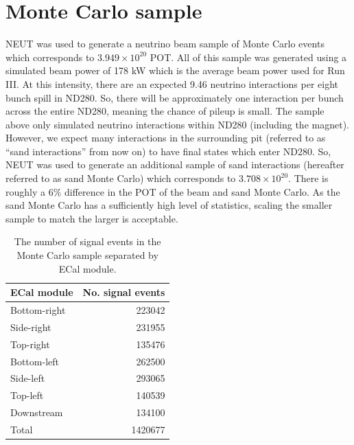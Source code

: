 \section{Monte Carlo sample}
\label{sec:MonteCarloSample}
NEUT was used to generate a neutrino beam sample of Monte Carlo events which corresponds to $3.949\times10^{20}$ POT.  All of this sample was generated using a simulated beam power of 178 kW which is the average beam power used for Run III.  At this intensity, there are an expected 9.46 neutrino interactions per eight bunch spill in ND280.  So, there will be approximately one interaction per bunch across the entire  ND280, meaning the chance of pileup is small. 
\newline
\newline
The sample  above only simulated neutrino interactions within ND280 (including the  magnet).  However, we expect many interactions in the surrounding pit (referred to as ``sand interactions'' from now on) to have final states which enter ND280.  So, NEUT was used to generate an additional sample of sand interactions (hereafter referred to as sand Monte Carlo) which corresponds to $3.708\times10^{20}$.  There is roughly a 6$\%$ difference in the POT of the beam and sand Monte Carlo.  As the sand Monte Carlo has a sufficiently high level of statistics, scaling the smaller sample to match the larger is acceptable.
\newline
\newline
\begin{table}
  \begin{tabular}{ l r }
    ECal module & No. signal events \\ \hline \hline
    Bottom-right & 223042 \\
    Side-right & 231955 \\
    Top-right & 135476 \\
    Bottom-left & 262500 \\
    Side-left & 293065 \\
    Top-left & 140539 \\
    Downstream & 134100 \\
    \hline
    Total & 1420677 \\
  \end{tabular}
  \caption{The number of signal events in the Monte Carlo sample separated by ECal module.}
  \label{table:NSignalEventsTruth}
\end{table}
